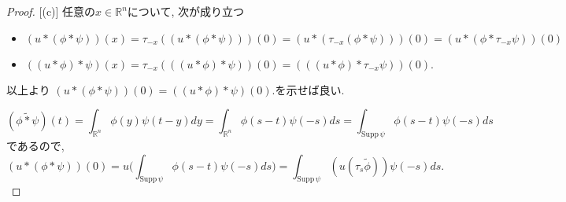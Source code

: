 \begin{proof}

[(c)] 任意の\(x \in \mathbb{R}^n\)について, 次が成り立つ
\begin{itemize}
\item \((u \ast (\phi \ast \psi))(x) 
= \tau_{-x}((u \ast (\phi \ast \psi)))(0) 
= (u \ast (\tau_{-x}(\phi \ast \psi)))(0)
= (u \ast (\phi\ast \tau_{-x}\psi))(0) \)
\item \( ((u \ast \phi) \ast \psi)(x) = \tau_{-x}(((u \ast \phi) \ast \psi))(0) 
= (((u \ast \phi) \ast \tau_{-x}\psi))(0).\)
\end{itemize}
以上より \((u \ast (\phi \ast \psi))(0) = ((u \ast \phi) \ast \psi)(0).\)を示せば良い.

\[
(\widetilde{\phi \ast \psi})(t) 
= \int_{\mathbb{R}^n} \phi(y) \psi(t-y) dy
= \int_{\mathbb{R}^n} \phi(s-t) \psi(-s) ds 
= \int_{\mathrm{Supp}\,\psi} \phi(s-t)\psi(-s) ds
\]
であるので, 
\begin{equation}
\label{eq-1-thm-H-2.10}
 (u \ast (\phi \ast \psi))(0) 
 = u\Big( \int_{\mathrm{Supp}\,\psi} \phi(s-t)\psi(-s) ds \Big)
 =\int_{\mathrm{Supp}\,\psi} (u(\tau_s \widetilde{\phi})) \psi(-s) ds.
\end{equation}


\end{proof}
